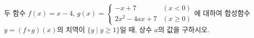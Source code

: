 두 함수 $f(x)=x-4$, $g(x)=\begin{cases} -x+7 & (x<0) \\ 2x^2-4ax+7 & (x\ge 0) \end{cases}$에 대하여 합성함수 $y=(f\circ g)(x)$의 치역이 $\{y \mid y\ge 1\}$일 때, 상수 $a$의 값을 구하시오.
